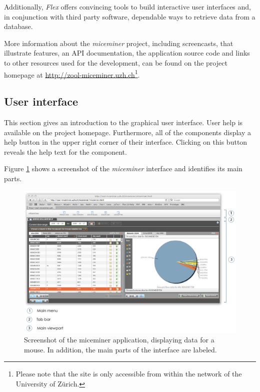 Additionally, \textit{Flex} offers convincing tools to build interactive user interfaces and, in conjunction with third party software, dependable ways to retrieve data from a database. 


More information about the \textit{miceminer} project, including screencasts, that illustrate features, an \ac{API} documentation, the application source code and links to other resources used for the development, can be found on the project homepage at \href{http://zool-miceminer.uzh.ch/}{http://zool-miceminer.uzh.ch}\footnote{Please note that the site is only accessible from within the network of the University of Z\"urich.}. 

\subsection{User interface}
\label{subsec:miceminer_interface}

This section gives an introduction to the graphical user interface. User help is available on the project homepage. Furthermore, all of the components display a help button in the upper right corner of their interface. Clicking on this button reveals the help text for the component.

Figure \ref{fig:interface_overview} shows a screenshot of the \textit{miceminer} interface and identifies its main parts.

\begin{figure}
  \includegraphics[width=\textwidth]{assets/pdf/interface_overview.pdf}
  \caption[\textit{miceminer} interface overview]{Screenshot of the miceminer application, displaying data for a mouse. In addition, the main parts of the interface are labeled.}
  \label{fig:interface_overview}
\end{figure}

